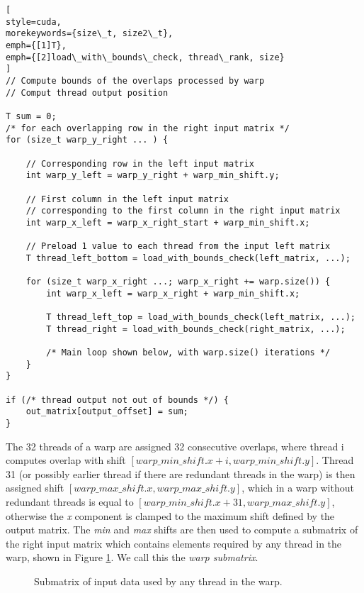 \begin{lstlisting}[
style=cuda,
morekeywords={size\_t, size2\_t},
emph={[1]T},
emph={[2]load\_with\_bounds\_check, thread\_rank, size}
]
// Compute bounds of the overlaps processed by warp
// Comput thread output position

T sum = 0;
/* for each overlapping row in the right input matrix */
for (size_t warp_y_right ... ) {

	// Corresponding row in the left input matrix
	int warp_y_left = warp_y_right + warp_min_shift.y;
	
	// First column in the left input matrix 
	// corresponding to the first column in the right input matrix
	int warp_x_left = warp_x_right_start + warp_min_shift.x;
	
	// Preload 1 value to each thread from the input left matrix
	T thread_left_bottom = load_with_bounds_check(left_matrix, ...);
	
	for (size_t warp_x_right ...; warp_x_right += warp.size()) {
		int warp_x_left = warp_x_right + warp_min_shift.x;
		
		T thread_left_top = load_with_bounds_check(left_matrix, ...);
		T thread_right = load_with_bounds_check(right_matrix, ...);
		
		/* Main loop shown below, with warp.size() iterations */
	}
}

if (/* thread output not out of bounds */) {
	out_matrix[output_offset] = sum;
}
\end{lstlisting}

The 32 threads of a warp are assigned 32 consecutive overlaps, where thread i computes overlap with shift $[warp\_min\_shift.x + i, warp\_min\_shift.y]$. Thread 31 (or possibly earlier thread if there are redundant threads in the warp) is then assigned shift $[warp\_max\_shift.x, warp\_max\_shift.y]$, which in a warp without redundant threads is equal to $[warp\_min\_shift.x + 31, warp\_max\_shift.y]$, otherwise the \textit{x} component is clamped to the maximum shift defined by the output matrix. The \textit{min} and \textit{max} shifts are then used to compute a submatrix of the right input matrix which contains elements required by any thread in the warp, shown in Figure \ref{fig:common_submatrix}. We call this the \textit{warp submatrix}.

\begin{figure}[ht]
	\centering
	\def\svgwidth{0.5\textwidth}
	
	\caption{Submatrix of input data used by any thread in the warp.}
	\label{fig:common_submatrix}
\end{figure}

